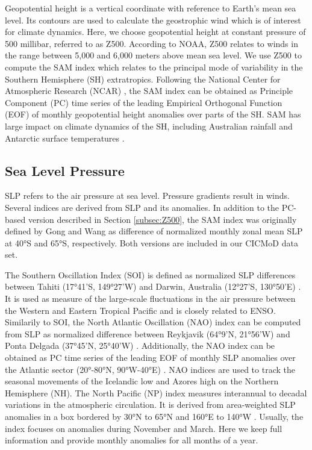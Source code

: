 \documentclass{CUP-JNL-DTM}%
\theoremstyle{definition}
\numberwithin{equation}{section}
\begin{document}
Geopotential height is a vertical coordinate with reference to Earth's mean sea level. Its contours are used to calculate the geostrophic wind which is of interest for climate dynamics. Here, we choose geopotential height at constant pressure of 500 millibar, referred to as Z500. According to NOAA, Z500 relates to winds in the range between 5,000 and 6,000 meters above mean sea level. We use Z500 to compute the SAM index which relates to the principal mode of variability in the Southern Hemisphere (SH) extratropics. Following the National Center for Atmospheric Research (NCAR) \cite{NCAR}, the SAM index can be obtained as Principle Component (PC) time series of the leading Empirical Orthogonal Function (EOF) of monthly geopotential height anomalies over parts of the SH. SAM has large impact on climate dynamics of the SH, including Australian rainfall and Antarctic surface temperatures \cite{Marshall2007}.  

\subsection{Sea Level Pressure \label{subsec:SLP}}

SLP refers to the air pressure at sea level. Pressure gradients result in winds. Several indices are derived from SLP and its anomalies. In addition to the PC-based version described in Section \ref{subsec:Z500}, the SAM index was originally defined by Gong and Wang \cite{Gong1999} as difference of normalized monthly zonal mean SLP at 40°S and 65°S, respectively. Both versions are included in our CICMoD data set.

The Southern Oscillation Index (SOI) is defined as normalized SLP differences between Tahiti (17°41'S, 149°27'W) and Darwin, Australia (12°27'S, 130°50'E) \cite{Walker1932}. It is used as measure of the large-scale fluctuations in the air pressure between the Western and Eastern Tropical Pacific and is closely related to ENSO. Similarily to SOI, the North Atlantic Oscillation (NAO) index can be computed from SLP as normalized difference between Reykjavik (64°9'N, 21°56'W) and Ponta Delgada (37°45'N, 25°40'W) \cite{Hurrell1995}. Additionally, the NAO index can be obtained as PC time series of the leading EOF of monthly SLP anomalies over the Atlantic sector (20°-80°N, 90°W-40°E) \cite{NCAR}. NAO indices are used to track the seasonal movements of the Icelandic low and Azores high on the Northern Hemisphere (NH). The North Pacific (NP) index measures interannual to decadal variations in the atmospheric circulation. It is derived from area-weighted SLP anomalies in a box bordered by 30°N to 65°N and 160°E to 140°W \cite{Trenberth1994}. Usually, the index focuses on anomalies during November and March. Here we keep full information and provide monthly anomalies for all months of a year.
\end{document}
